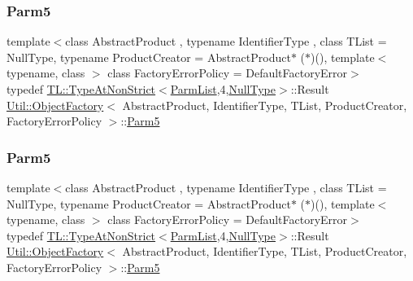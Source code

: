 \subsubsection{\texorpdfstring{Parm5}{Parm5}\hspace{0.1cm}{\footnotesize\ttfamily [1/2]}}
{\footnotesize\ttfamily template$<$class Abstract\+Product , typename Identifier\+Type , class T\+List  = Null\+Type, typename Product\+Creator  = Abstract\+Product$\ast$ ($\ast$)(), template$<$ typename, class $>$ class Factory\+Error\+Policy = Default\+Factory\+Error$>$ \\
typedef \mbox{\hyperlink{structUtil_1_1TL_1_1TypeAtNonStrict}{T\+L\+::\+Type\+At\+Non\+Strict}}$<$\mbox{\hyperlink{classUtil_1_1ObjectFactory_a46f003a5928e8a60140e0a74ac261c36}{Parm\+List}},4,\mbox{\hyperlink{classUtil_1_1NullType}{Null\+Type}}$>$\+::Result \mbox{\hyperlink{classUtil_1_1ObjectFactory}{Util\+::\+Object\+Factory}}$<$ Abstract\+Product, Identifier\+Type, T\+List, Product\+Creator, Factory\+Error\+Policy $>$\+::\mbox{\hyperlink{classUtil_1_1ObjectFactory_a11006cc1ea90957dd8e5604c2d9e069d}{Parm5}}}

\mbox{\label{classUtil_1_1ObjectFactory_a11006cc1ea90957dd8e5604c2d9e069d}} 
\subsubsection{\texorpdfstring{Parm5}{Parm5}\hspace{0.1cm}{\footnotesize\ttfamily [2/2]}}
{\footnotesize\ttfamily template$<$class Abstract\+Product , typename Identifier\+Type , class T\+List  = Null\+Type, typename Product\+Creator  = Abstract\+Product$\ast$ ($\ast$)(), template$<$ typename, class $>$ class Factory\+Error\+Policy = Default\+Factory\+Error$>$ \\
typedef \mbox{\hyperlink{structUtil_1_1TL_1_1TypeAtNonStrict}{T\+L\+::\+Type\+At\+Non\+Strict}}$<$\mbox{\hyperlink{classUtil_1_1ObjectFactory_a46f003a5928e8a60140e0a74ac261c36}{Parm\+List}},4,\mbox{\hyperlink{classUtil_1_1NullType}{Null\+Type}}$>$\+::Result \mbox{\hyperlink{classUtil_1_1ObjectFactory}{Util\+::\+Object\+Factory}}$<$ Abstract\+Product, Identifier\+Type, T\+List, Product\+Creator, Factory\+Error\+Policy $>$\+::\mbox{\hyperlink{classUtil_1_1ObjectFactory_a11006cc1ea90957dd8e5604c2d9e069d}{Parm5}}}

